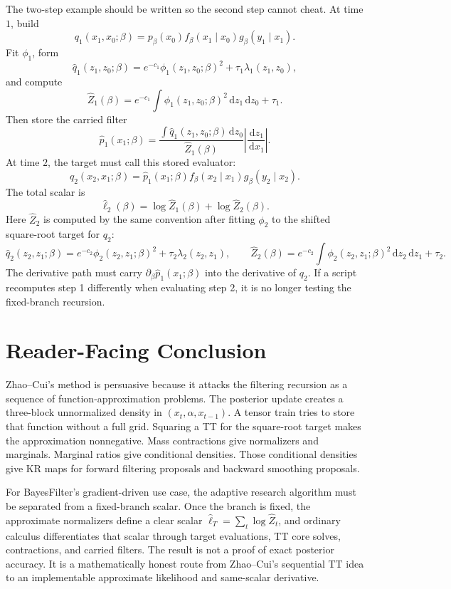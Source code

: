\documentclass[11pt]{article}
\newcommand{\dd}{\,\mathrm d}
\begin{document}
The two-step example should be written so the second step cannot cheat.  At
time \(1\), build
\[
    q_1(x_1,x_0;\beta)
    =
    p_\beta(x_0)f_\beta(x_1\mid x_0)g_\beta(y_1\mid x_1).
\]
Fit \(\phi_1\), form
\[
    \widehat q_1(z_1,z_0;\beta)
    =
    e^{-c_1}\phi_1(z_1,z_0;\beta)^2+\tau_1\lambda_1(z_1,z_0),
\]
and compute
\[
    \widehat Z_1(\beta)
    =
    e^{-c_1}\int \phi_1(z_1,z_0;\beta)^2\dd z_1\dd z_0+\tau_1.
\]
Then store the carried filter
\[
    \widehat p_1(x_1;\beta)
    =
    \frac{\int \widehat q_1(z_1,z_0;\beta)\dd z_0}
    {\widehat Z_1(\beta)}
    \left|\frac{\dd z_1}{\dd x_1}\right|.
\]
At time \(2\), the target must call this stored evaluator:
\[
    q_2(x_2,x_1;\beta)
    =
    \widehat p_1(x_1;\beta)
    f_\beta(x_2\mid x_1)g_\beta(y_2\mid x_2).
\]
The total scalar is
\[
    \widehat\ell_2(\beta)
    =
    \log\widehat Z_1(\beta)+\log\widehat Z_2(\beta).
\]
Here \(\widehat Z_2\) is computed by the same convention after fitting
\(\phi_2\) to the shifted square-root target for \(q_2\):
\[
    \widehat q_2(z_2,z_1;\beta)
    =
    e^{-c_2}\phi_2(z_2,z_1;\beta)^2+\tau_2\lambda_2(z_2,z_1),
    \qquad
    \widehat Z_2(\beta)
    =
    e^{-c_2}\int \phi_2(z_2,z_1;\beta)^2\dd z_2\dd z_1+\tau_2 .
\]
The derivative path must carry
\(\partial_\beta\widehat p_1(x_1;\beta)\) into the derivative of \(q_2\).
If a script recomputes step 1 differently when evaluating step 2, it is no
longer testing the fixed-branch recursion.

\section{Reader-Facing Conclusion}

Zhao--Cui's method is persuasive because it attacks the filtering recursion as
a sequence of function-approximation problems.  The posterior update creates a
three-block unnormalized density in \((x_t,\alpha,x_{t-1})\).  A tensor train
tries to store that function without a full grid.  Squaring a TT for the
square-root target makes the approximation nonnegative.  Mass contractions give
normalizers and marginals.  Marginal ratios give conditional densities.  Those
conditional densities give KR maps for forward filtering proposals and backward
smoothing proposals.

For BayesFilter's gradient-driven use case, the adaptive research algorithm
must be separated from a fixed-branch scalar.  Once the branch is fixed, the
approximate normalizers define a clear scalar
\(\widehat\ell_T=\sum_t\log\widehat Z_t\), and ordinary calculus differentiates
that scalar through target evaluations, TT core solves, contractions, and
carried filters.  The result is not a proof of exact posterior accuracy.  It is
a mathematically honest route from Zhao--Cui's sequential TT idea to an
implementable approximate likelihood and same-scalar derivative.
\end{document}
